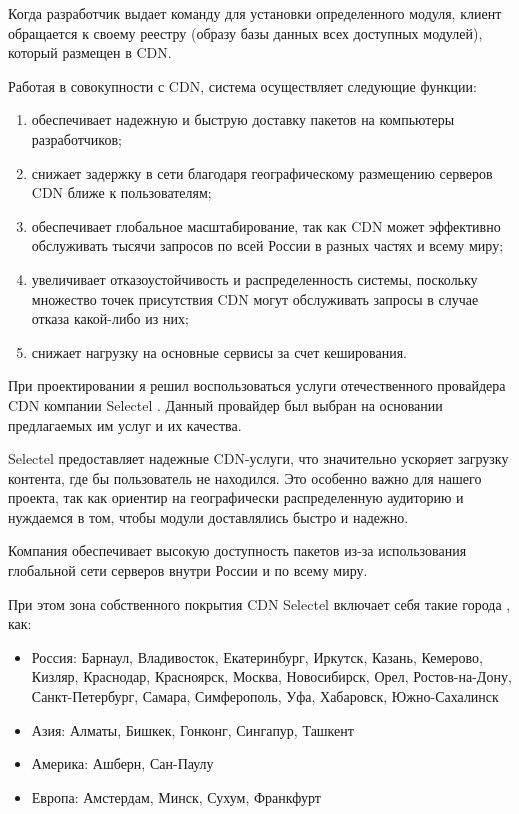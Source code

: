 Когда разработчик выдает команду для установки определенного модуля, клиент обращается к своему реестру (образу базы данных всех доступных модулей), который размещен в CDN.

Работая в совокупности с CDN, система осуществляет следующие функции:

\begin{enumerate}
    \item обеспечивает надежную и быструю доставку пакетов на компьютеры разработчиков;
    \item снижает задержку в сети благодаря географическому размещению серверов CDN ближе к пользователям;
    \item обеспечивает глобальное масштабирование, так как CDN может эффективно обслуживать тысячи запросов по всей России в разных частях и всему миру;
    \item увеличивает отказоустойчивость и распределенность системы, поскольку множество точек присутствия CDN могут обслуживать запросы в случае отказа какой-либо из них;
    \item снижает нагрузку на основные сервисы за счет кеширования.
\end{enumerate}

 При проектировании я решил воспользоваться услуги отечественного провайдера CDN компании Selectel \cite{cdn:selectel}. Данный провайдер был выбран на основании предлагаемых им услуг и их качества.

Selectel предоставляет надежные CDN-услуги, что значительно ускоряет загрузку контента, где бы пользователь не находился. Это особенно важно для нашего проекта, так как ориентир на географически распределенную аудиторию и нуждаемся в том, чтобы модули доставлялись быстро и надежно.

Компания обеспечивает высокую доступность пакетов из-за использования глобальной сети серверов внутри России и по всему миру.

При этом зона собственного покрытия CDN Selectel включает себя такие города \cite{cdn:selectel}, как:
\begin{itemize}
    \item Россия: Барнаул, Владивосток, Екатеринбург, Иркутск, Казань, Кемерово, Кизляр, Краснодар, Красноярск, Москва, Новосибирск, Орел, Ростов-на-Дону, Санкт-Петербург, Самара, Симферополь, Уфа, Хабаровск, Южно-Сахалинск
    \item Азия: Алматы, Бишкек, Гонконг, Сингапур, Ташкент
    \item Америка: Ашберн, Сан-Паулу
    \item Европа: Амстердам, Минск, Сухум, Франкфурт
\end{itemize}

